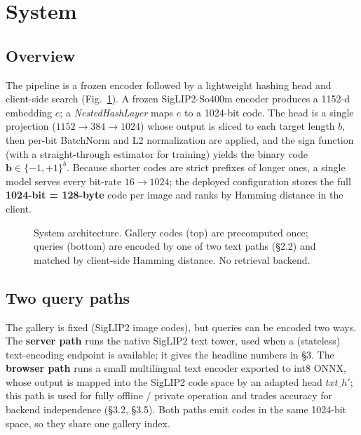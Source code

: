\documentclass[letterpaper]{article} %
\begin{document}
\section{System}
\label{sec:system}

\subsection{Overview}
The pipeline is a frozen encoder followed by a lightweight hashing head and client-side search
(Fig.~\ref{fig:arch}). A frozen SigLIP2-So400m encoder produces a 1152-d embedding $e$; a
\emph{NestedHashLayer} maps $e$ to a 1024-bit code. The head is a single projection
($1152\!\to\!384\!\to\!1024$) whose output is sliced to each target length $b$, then per-bit
BatchNorm and L2 normalization are applied, and the sign function (with a straight-through estimator
for training) yields the binary code $\mathbf{b}\in\{-1,+1\}^{b}$. Because shorter codes are strict
prefixes of longer ones, a single model serves every bit-rate $16\!\to\!1024$; the deployed
configuration stores the full \textbf{1024-bit = 128-byte} code per image and ranks by Hamming
distance in the client.

\begin{figure}[t]
\centering
{}
\caption{System architecture. Gallery codes (top) are precomputed once; queries (bottom) are
encoded by one of two text paths (\S2.2) and matched by client-side Hamming distance. No retrieval
backend.}
\label{fig:arch}
\end{figure}

\subsection{Two query paths}
The gallery is fixed (SigLIP2 image codes), but queries can be encoded two ways. The
\textbf{server path} runs the native SigLIP2 text tower, used when a (stateless) text-encoding
endpoint is available; it gives the headline numbers in \S3. The \textbf{browser path} runs a small
multilingual text encoder exported to int8 ONNX, whose output is mapped into the SigLIP2 code space
by an adapted head $\mathit{txt\_h}'$; this path is used for fully offline / private operation and
trades accuracy for backend independence (\S3.2, \S3.5). Both paths emit codes in the same 1024-bit
space, so they share one gallery index.
\end{document}
